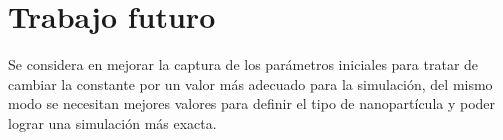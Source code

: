 \documentclass{elsarticle}
\begin{document}
\section{Trabajo futuro}
Se considera en mejorar la captura de los parámetros iniciales para tratar de cambiar la constante por un valor más adecuado para la simulación, del mismo modo se necesitan mejores valores para definir el tipo de nanopartícula y poder lograr una simulación más exacta.



\end{document}
